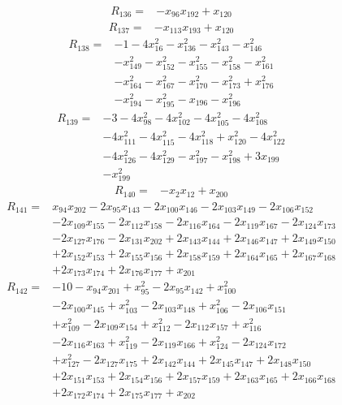 \begin{align*} R_{136}={}&-x_{96}x_{192} +x_{120}
\end{align*}
\begin{align*} R_{137}={}&-x_{113}x_{193} +x_{120}
\end{align*}
\begin{align*} R_{138}={}&-1 -4 x_{16}^{2} -x_{136}^{2} -x_{143}^{2} -x_{146}^{2}
\\ &-x_{149}^{2} -x_{152}^{2} -x_{155}^{2} -x_{158}^{2} -x_{161}^{2}
\\ &-x_{164}^{2} -x_{167}^{2} -x_{170}^{2} -x_{173}^{2} +x_{176}^{2}
\\ &-x_{194}^{2} -x_{195}^{2} -x_{196} -x_{196}^{2}
\end{align*}
\begin{align*} R_{139}={}&-3 -4 x_{98}^{2} -4 x_{102}^{2} -4 x_{105}^{2} -4 x_{108}^{2}
\\ &-4 x_{111}^{2} -4 x_{115}^{2} -4 x_{118}^{2} +x_{120}^{2} -4 x_{122}^{2}
\\ &-4 x_{126}^{2} -4 x_{129}^{2} -x_{197}^{2} -x_{198}^{2} +3 x_{199}
\\ &-x_{199}^{2}
\end{align*}
\begin{align*} R_{140}={}&-x_{2}x_{12} +x_{200}
\end{align*}
\begin{align*} R_{141}={}&x_{94}x_{202} -2 x_{95}x_{143} -2 x_{100}x_{146} -2 x_{103}x_{149} -2 x_{106}x_{152}
\\ &-2 x_{109}x_{155} -2 x_{112}x_{158} -2 x_{116}x_{164} -2 x_{119}x_{167} -2 x_{124}x_{173}
\\ &-2 x_{127}x_{176} -2 x_{131}x_{202} +2 x_{143}x_{144} +2 x_{146}x_{147} +2 x_{149}x_{150}
\\ &+2 x_{152}x_{153} +2 x_{155}x_{156} +2 x_{158}x_{159} +2 x_{164}x_{165} +2 x_{167}x_{168}
\\ &+2 x_{173}x_{174} +2 x_{176}x_{177} +x_{201}
\end{align*}
\begin{align*} R_{142}={}&-10 -x_{94}x_{201} +x_{95}^{2} -2 x_{95}x_{142} +x_{100}^{2}
\\ &-2 x_{100}x_{145} +x_{103}^{2} -2 x_{103}x_{148} +x_{106}^{2} -2 x_{106}x_{151}
\\ &+x_{109}^{2} -2 x_{109}x_{154} +x_{112}^{2} -2 x_{112}x_{157} +x_{116}^{2}
\\ &-2 x_{116}x_{163} +x_{119}^{2} -2 x_{119}x_{166} +x_{124}^{2} -2 x_{124}x_{172}
\\ &+x_{127}^{2} -2 x_{127}x_{175} +2 x_{142}x_{144} +2 x_{145}x_{147} +2 x_{148}x_{150}
\\ &+2 x_{151}x_{153} +2 x_{154}x_{156} +2 x_{157}x_{159} +2 x_{163}x_{165} +2 x_{166}x_{168}
\\ &+2 x_{172}x_{174} +2 x_{175}x_{177} +x_{202}
\end{align*}
